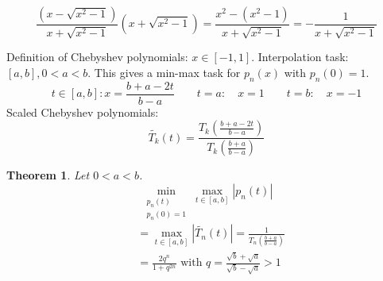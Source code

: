 \documentclass{article}
\newtheorem{theorem}{Theorem}
\newcommand{\card}[1]{\left|#1\right|}
\begin{document}
\[
  \frac{(x - \sqrt{x^2 - 1})}{x + \sqrt{x^2 - 1}} \left(x + \sqrt{x^2 - 1}\right)
  = \frac{x^2 - (x^2 - 1)}{x + \sqrt{x^2 - 1}}
  = -\frac{1}{x + \sqrt{x^2 - 1}}
\]

Definition of Chebyshev polynomials:
$x \in [-1,1]$.
Interpolation task: $[a,b], 0 < a < b$.
This gives a min-max task for $p_n(x)$ with $p_n(0)=1$.
\[
  t \in [a,b]:
  x = \frac{b + a - 2t}{b - a} \qquad
  t = a: \quad x = 1 \qquad
  t = b: \quad x = -1
\]
Scaled Chebyshev polynomials:
\[
  \tilde{T_k}(t) = \frac{
    T_k\left(\frac{b + a - 2t}{b - a}\right)
  }{
    T_k\left(\frac{b + a}{b - a}\right)
  }
\]

\begin{theorem}
  Let $0 < a < b$.
  \[ \min_{\substack{p_n(t) \\ p_n(0)=1}} \max_{t \in [a,b]} \card{p_n(t)} \]
  \begin{align*}
    &= \max_{t \in [a,b]} \card{\tilde{T_n}(t)} = \frac{1}{T_n\left(\frac{b + a}{b - a}\right)} \\
    &= \frac{2q^n}{1 + q^{2n}} \text{ with } q = \frac{\sqrt b + \sqrt a}{\sqrt b - \sqrt a} > 1
  \end{align*}
\end{theorem}
\end{document}
